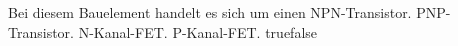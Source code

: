     {Bei diesem Bauelement handelt es sich um einen }
    {NPN-Transistor.}
    {PNP-Transistor.}
    {N-Kanal-FET.}
    {P-Kanal-FET.}
    {true}{false}